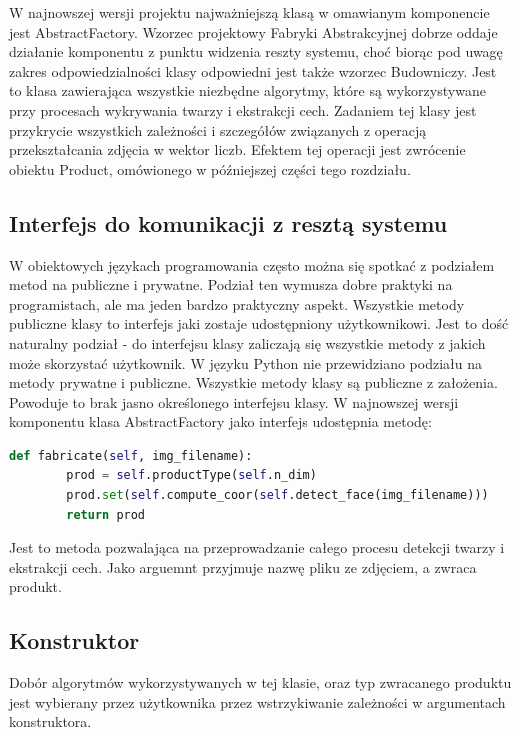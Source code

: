 \documentclass[oneside, eng]{mgr}
\begin{document}
W najnowszej wersji projektu najważniejszą klasą w omawianym komponencie jest AbstractFactory. Wzorzec projektowy Fabryki Abstrakcyjnej dobrze oddaje działanie komponentu z punktu widzenia reszty systemu, choć biorąc pod uwagę zakres odpowiedzialności klasy odpowiedni jest także wzorzec Budowniczy. Jest to klasa zawierająca wszystkie niezbędne algorytmy, które są wykorzystywane przy procesach wykrywania twarzy i ekstrakcji cech. Zadaniem tej klasy jest przykrycie wszystkich zależności i szczegółów związanych z operacją przekształcania zdjęcia w wektor liczb. Efektem tej operacji jest zwrócenie obiektu Product, omówionego w późniejszej części tego rozdziału.

\subsection{Interfejs do komunikacji z resztą systemu}

W obiektowych językach programowania często można się spotkać z podziałem metod na publiczne i prywatne. Podział ten wymusza dobre praktyki na programistach, ale ma jeden bardzo praktyczny aspekt. Wszystkie metody publiczne klasy to interfejs jaki zostaje udostępniony użytkownikowi. Jest to dość naturalny podział - do interfejsu klasy zaliczają się wszystkie metody z jakich może skorzystać użytkownik. W języku Python nie przewidziano podziału na metody prywatne i publiczne. Wszystkie metody klasy są publiczne z założenia. Powoduje to brak jasno określonego interfejsu klasy. W najnowszej wersji komponentu klasa AbstractFactory jako interfejs udostępnia metodę:

\begin{lstlisting}[language=Python]
    def fabricate(self, img_filename):
        prod = self.productType(self.n_dim)
        prod.set(self.compute_coor(self.detect_face(img_filename)))
        return prod
\end{lstlisting}

Jest to metoda pozwalająca na przeprowadzanie całego procesu detekcji twarzy i ekstrakcji cech. Jako arguemnt przyjmuje nazwę pliku ze zdjęciem, a zwraca produkt.

\subsection{Konstruktor}

Dobór algorytmów wykorzystywanych w tej klasie, oraz typ zwracanego produktu jest wybierany przez użytkownika przez wstrzykiwanie zależności w argumentach konstruktora.
\end{document}
